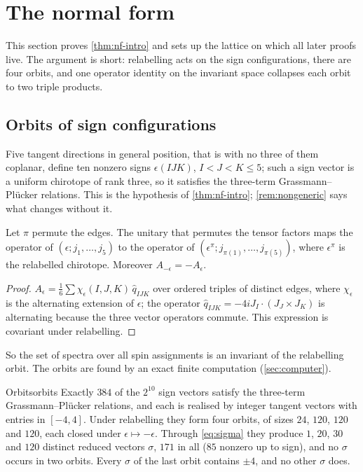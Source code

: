 \section{The normal form}\label{sec:normalform}

This section proves \cref{thm:nf-intro} and sets up the lattice on which all later
proofs live. The argument is short: relabelling acts on the sign configurations,
there are four orbits, and one operator identity on the invariant space collapses
each orbit to two triple products.

\subsection{Orbits of sign configurations}

Five tangent directions in general position, that is with no three of them coplanar,
define ten nonzero signs $\epsilon(IJK)$, $I<J<K\le5$; such a sign vector is a uniform
chirotope of rank three, so it satisfies the three-term Grassmann--Pl\"ucker relations.
This is the hypothesis of \cref{thm:nf-intro}; \cref{rem:nongeneric} says what
changes without it.

\begin{lemma}[Relabelling]\label{lem:relabel}
Let $\pi$ permute the edges. The unitary that permutes the tensor factors maps the
operator of $(\epsilon;j_1,\dots,j_5)$ to the operator of
$(\epsilon^\pi;j_{\pi(1)},\dots,j_{\pi(5)})$, where $\epsilon^\pi$ is the relabelled
chirotope. Moreover $A_{-\epsilon}=-A_\epsilon$.
\end{lemma}

\begin{proof}
$A_\epsilon=\frac16\sum\chi_\epsilon(I,J,K)\,\hat q_{IJK}$ over ordered triples of
distinct edges, where $\chi_\epsilon$ is the alternating extension of $\epsilon$; the
operator $\hat q_{IJK}=-4iJ_I\cdot(J_J\times J_K)$ is alternating because the three
vector operators commute. This expression is covariant under relabelling.
\end{proof}

So the set of spectra over all spin assignments is an invariant of the relabelling
orbit. The orbits are found by an exact finite computation (\cref{sec:computer}).

\begin{proposition}{Orbits}{orbits}
Exactly $384$ of the $2^{10}$ sign vectors satisfy the three-term
Grassmann--Pl\"ucker relations, and each is realised by integer tangent vectors with
entries in $[-4,4]$. Under relabelling they form four orbits, of sizes $24$, $120$,
$120$ and $120$, each closed under $\epsilon\mapsto-\epsilon$. Through
\eqref{eq:sigma} they produce $1$, $20$, $30$ and $120$ distinct reduced vectors
$\sigma$, $171$ in all ($85$ nonzero up to sign), and no $\sigma$ occurs in two orbits.
Every $\sigma$ of the last orbit contains $\pm4$, and no other $\sigma$ does.
\end{proposition}

